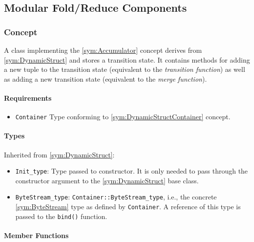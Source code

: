 \subsection{Modular Fold/Reduce Components}

\subsubsection[Concept Accumulator]{Concept }

A class implementing the \ref{sym:Accumulator} concept derives from \ref{sym:DynamicStruct} and stores a transition state. It contains methods for adding a new tuple to the transition state (equivalent to the \emph{transition function}) as well as adding a new transition state (equivalent to the \emph{merge function}).

\paragraph{Requirements}

\begin{itemize}
	\item \texttt{Container} Type conforming to \ref{sym:DynamicStructContainer} concept.
\end{itemize}

\paragraph{Types}

Inherited from \ref{sym:DynamicStruct}:
\begin{itemize}
	\item \texttt{Init\_type}: Type passed to constructor. It is only needed to pass through the constructor argument to the \ref{sym:DynamicStruct} base class.
	\item \texttt{ByteStream\_type}: \texttt{Container::ByteStream\_type}, i.e., the concrete \ref{sym:ByteStream} type as defined by \texttt{Container}. A reference of this type is passed to the \texttt{bind()} function.
\end{itemize}

\paragraph{Member Functions}

